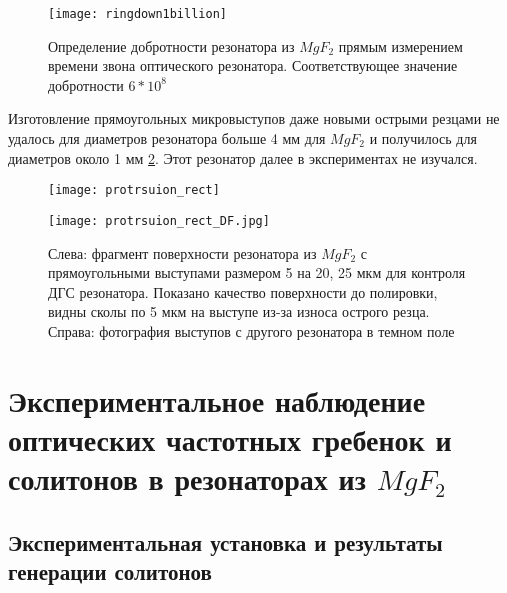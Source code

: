 \begin{figure}[ht]
\centering
  \texttt{[image: ringdown1billion]}
  \caption{Определение добротности резонатора из $MgF_2$ прямым измерением времени звона оптического резонатора. Соответствующее значение добротности $6*10^8$}
  \label{ringdown}
\end{figure}


Изготовление прямоугольных микровыступов даже новыми острыми резцами не удалось для диаметров резонатора больше 4 мм для $MgF_2$ и получилось для диаметров около 1 мм \ref{protrsuion_rect}. Этот резонатор далее в экспериментах не изучался.

\begin{figure}[ht]
  \begin{minipage}[ht]{0.49\linewidth}\centering
    \texttt{[image: protrsuion\_rect]}
  \end{minipage}
  \hfill
  \begin{minipage}[ht]{0.49\linewidth}\centering
    \texttt{[image: protrsuion\_rect\_DF.jpg]}
  \end{minipage}
  \caption{Слева: фрагмент поверхности резонатора из $MgF_2$ с прямоугольными выступами размером 5 на 20, 25 мкм для контроля ДГС резонатора. Показано качество поверхности до полировки, видны сколы по 5 мкм на выступе из-за износа острого резца. Справа: фотография выступов с другого резонатора в темном поле}
  \label{protrsuion_rect}
\end{figure}



\section{Экспериментальное наблюдение оптических частотных гребенок и солитонов в резонаторах из $MgF_2$}


\subsection{Экспериментальная установка и результаты генерации солитонов}


